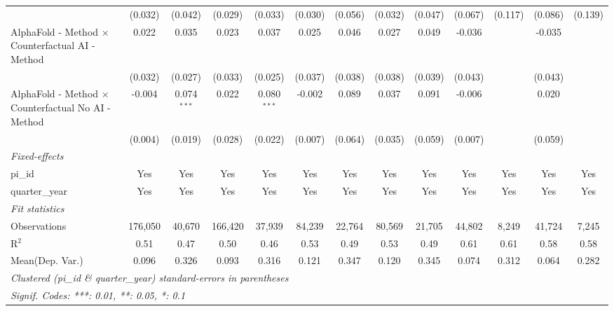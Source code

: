 \begin{tabular}{lcccccccccccc}
                                                              & (0.032)       & (0.042)       & (0.029)       & (0.033)       & (0.030)       & (0.056)       & (0.032)       & (0.047)       & (0.067) & (0.117) & (0.086)     & (0.139)\\   
   AlphaFold - Method $\times$ Counterfactual AI - Method     & 0.022         & 0.035         & 0.023         & 0.037         & 0.025         & 0.046         & 0.027         & 0.049         & -0.036  &         & -0.035      &   \\   
                                                              & (0.032)       & (0.027)       & (0.033)       & (0.025)       & (0.037)       & (0.038)       & (0.038)       & (0.039)       & (0.043) &         & (0.043)     &   \\   
   AlphaFold - Method $\times$ Counterfactual No AI - Method  & -0.004        & 0.074$^{***}$ & 0.022         & 0.080$^{***}$ & -0.002        & 0.089         & 0.037         & 0.091         & -0.006  &         & 0.020       &   \\   
                                                              & (0.004)       & (0.019)       & (0.028)       & (0.022)       & (0.007)       & (0.064)       & (0.035)       & (0.059)       & (0.007) &         & (0.059)     &   \\   
   \midrule
   \emph{Fixed-effects}\\
   pi\_id                                                     & Yes           & Yes           & Yes           & Yes           & Yes           & Yes           & Yes           & Yes           & Yes     & Yes     & Yes         & Yes\\  
   quarter\_year                                              & Yes           & Yes           & Yes           & Yes           & Yes           & Yes           & Yes           & Yes           & Yes     & Yes     & Yes         & Yes\\  
   \midrule
   \emph{Fit statistics}\\
   Observations                                               & 176,050       & 40,670        & 166,420       & 37,939        & 84,239        & 22,764        & 80,569        & 21,705        & 44,802  & 8,249   & 41,724      & 7,245\\  
   R$^2$                                                      & 0.51          & 0.47          & 0.50          & 0.46          & 0.53          & 0.49          & 0.53          & 0.49          & 0.61    & 0.61    & 0.58        & 0.58\\  
Mean(Dep. Var.) & 0.096 & 0.326 & 0.093 & 0.316 & 0.121 & 0.347 & 0.120 & 0.345 & 0.074 & 0.312 & 0.064 & 0.282 \\
   \midrule \midrule
   \multicolumn{13}{l}{\emph{Clustered (pi\_id \& quarter\_year) standard-errors in parentheses}}\\
   \multicolumn{13}{l}{\emph{Signif. Codes: ***: 0.01, **: 0.05, *: 0.1}}\\
\end{tabular}
\par\endgroup
